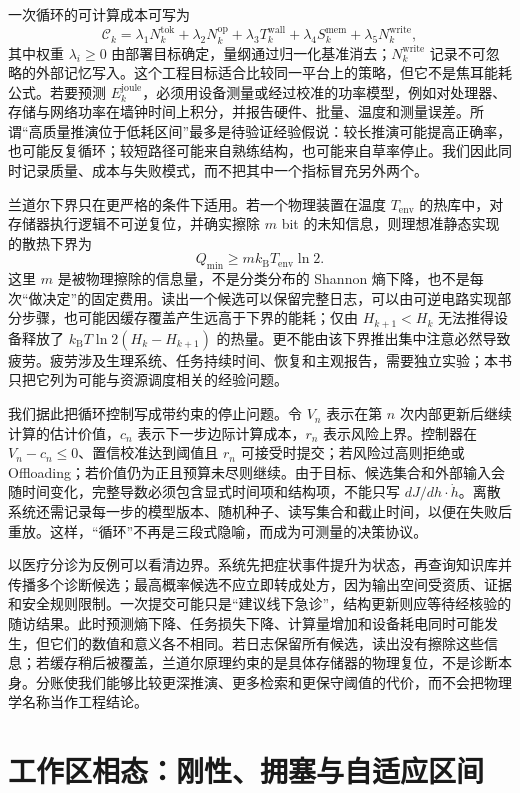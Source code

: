 一次循环的可计算成本可写为
\[
\mathcal C_k=\lambda_1N^{\mathrm{tok}}_k+\lambda_2N^{\mathrm{op}}_k+\lambda_3T^{\mathrm{wall}}_k+\lambda_4S^{\mathrm{mem}}_k+\lambda_5N^{\mathrm{write}}_k,
\]
其中权重 $\lambda_i\ge0$ 由部署目标确定，量纲通过归一化基准消去；$N^{\mathrm{write}}_k$ 记录不可忽略的外部记忆写入。这个工程目标适合比较同一平台上的策略，但它不是焦耳能耗公式。若要预测 $E^{\mathrm{joule}}_k$，必须用设备测量或经过校准的功率模型，例如对处理器、存储与网络功率在墙钟时间上积分，并报告硬件、批量、温度和测量误差。所谓“高质量推演位于低耗区间”最多是待验证经验假说：较长推演可能提高正确率，也可能反复循环；较短路径可能来自熟练结构，也可能来自草率停止。我们因此同时记录质量、成本与失败模式，而不把其中一个指标冒充另外两个。

兰道尔下界只在更严格的条件下适用。若一个物理装置在温度 $T_{\mathrm{env}}$ 的热库中，对存储器执行逻辑不可逆复位，并确实擦除 $m$ bit 的未知信息，则理想准静态实现的散热下界为
\[
Q_{\min}\ge m k_{\mathrm B}T_{\mathrm{env}}\ln2.
\]
这里 $m$ 是被物理擦除的信息量，不是分类分布的 Shannon 熵下降，也不是每次“做决定”的固定费用。读出一个候选可以保留完整日志，可以由可逆电路实现部分步骤，也可能因缓存覆盖产生远高于下界的能耗；仅由 $H_{k+1}<H_k$ 无法推得设备释放了 $k_{\mathrm B}T\ln2(H_k-H_{k+1})$ 的热量。更不能由该下界推出集中注意必然导致疲劳。疲劳涉及生理系统、任务持续时间、恢复和主观报告，需要独立实验；本书只把它列为可能与资源调度相关的经验问题。

我们据此把循环控制写成带约束的停止问题。令 $V_n$ 表示在第 $n$ 次内部更新后继续计算的估计价值，$c_n$ 表示下一步边际计算成本，$r_n$ 表示风险上界。控制器在 $V_n-c_n\le0$、置信校准达到阈值且 $r_n$ 可接受时提交；若风险过高则拒绝或 Offloading；若价值仍为正且预算未尽则继续。由于目标、候选集合和外部输入会随时间变化，完整导数必须包含显式时间项和结构项，不能只写 $dJ/dh\cdot\dot h$。离散系统还需记录每一步的模型版本、随机种子、读写集合和截止时间，以便在失败后重放。这样，“循环”不再是三段式隐喻，而成为可测量的决策协议。

以医疗分诊为反例可以看清边界。系统先把症状事件提升为状态，再查询知识库并传播多个诊断候选；最高概率候选不应立即转成处方，因为输出空间受资质、证据和安全规则限制。一次提交可能只是“建议线下急诊”，结构更新则应等待经核验的随访结果。此时预测熵下降、任务损失下降、计算量增加和设备耗电同时可能发生，但它们的数值和意义各不相同。若日志保留所有候选，读出没有擦除这些信息；若缓存稍后被覆盖，兰道尔原理约束的是具体存储器的物理复位，不是诊断本身。分账使我们能够比较更深推演、更多检索和更保守阈值的代价，而不会把物理学名称当作工程结论。

\section{工作区相态：刚性、拥塞与自适应区间}
\label{sec:section_8209}

